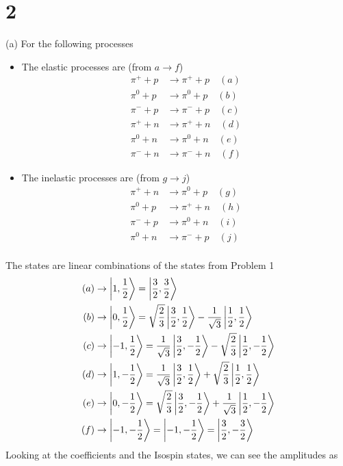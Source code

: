 \documentclass[../main.tex]{subfiles}
\newcommand{\thf}{\frac{3}{2}}
\newcommand{\ohf}{\frac{1}{2}}
\begin{document}
\section*{2}
(a) For the following processes
\begin{itemize}
    \item The elastic processes are (from $a \to f$)
    \begin{align*}
        \pi^+ + p &\rightarrow \pi^+ + p \quad (a) \\
        \pi^0 + p &\rightarrow \pi^0 + p \quad (b) \\
        \pi^- + p &\rightarrow \pi^- + p \quad (c) \\
        \pi^+ + n &\rightarrow \pi^+ + n \quad (d) \\
        \pi^0 + n &\rightarrow \pi^0 + n \quad (e) \\
        \pi^- + n &\rightarrow \pi^- + n \quad (f)
    \end{align*}
    \item The inelastic processes are (from $g \to j$)
    \begin{align*}
        \pi^+ + n &\to \pi^0 + p \quad (g) \\
        \pi^0 + p &\to \pi^+ + n \quad (h) \\
        \pi^- + p &\to \pi^0 + n \quad (i) \\
        \pi^0 + n &\to \pi^- + p \quad (j) \\
    \end{align*}
\end{itemize}
The states are linear combinations of the states from Problem 1
\newcommand{\stwo}{\sqrt{\frac{2}{3}}}
\newcommand{\sthree}{\frac{1}{\sqrt{3}}}
\begin{align*}
    (a) &\rightarrow \ket{1,\ohf} = \ket{\thf, \thf}\\
    (b) &\rightarrow \ket{0,\ohf} = \stwo \ket {\thf, \ohf} - \sthree  \ket{\ohf, \ohf} \\
    (c) &\rightarrow \ket{-1,\ohf} = \sthree \ket{\thf, -\ohf} - \stwo \ket{\ohf, -\ohf} \\
    (d) &\rightarrow \ket{1,-\ohf} = \sthree \ket{\thf, \ohf} + \stwo \ket{\ohf, \ohf} \\
    (e) &\rightarrow \ket{0,-\ohf} = \stwo \ket{\thf, -\ohf} + \sthree \ket{\ohf, -\ohf} \\
    (f) &\rightarrow \ket{-1,-\ohf} = \ket{-1,-\ohf} = \ket{\thf, -\thf}
\end{align*}
Looking at the coefficients and the Isospin states, we can see the amplitudes as
\end{document}
